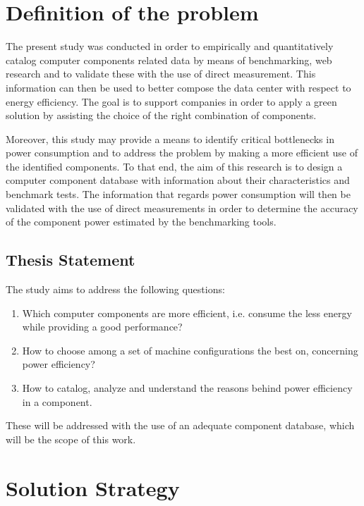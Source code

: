\section{Definition of the problem} \label{sec1:problem}

    The present study was conducted in order to empirically and quantitatively catalog computer components related data by means of benchmarking, web research and to validate these with the use of direct measurement. This information can then be used to better compose the data center with respect to energy efficiency. The goal is to support companies in order to apply a green solution by assisting the choice of the right combination of components.
    
    Moreover, this study may provide a means to identify critical bottlenecks in power consumption and to address the problem by making a more efficient use of the identified components. To that end, the aim of this research is to design a computer component database with information about their characteristics and benchmark tests. The information that regards power consumption will then be validated with the use of direct measurements in order to determine the accuracy of the component power estimated by the benchmarking tools.
    
    \subsection{Thesis Statement}\label{sec1:thesis_statement}
        The study aims to address the following questions:
        \begin{enumerate}
	        \item Which computer components are more efficient, i.e. consume the less energy while providing a good performance?
	        \item How to choose among a set of machine configurations the best on, concerning power efficiency?
	        \item How to catalog, analyze and understand the reasons behind power efficiency in a component.
        \end{enumerate}
        
    These will be addressed with the use of an adequate component database, which will be the scope of this work.

\section{Solution Strategy} \label{sec1:solution_strategy}

